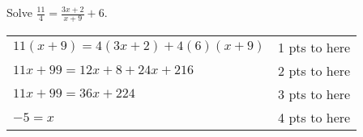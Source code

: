 
{
	Solve $\displaystyle \frac{11}{4}=\frac{3x+2}{x+9}+6$.
}
{
	\begin{tabular}{l r}
	$11(x+9)=4(3x+2)+4(6)(x+9)$ & 1 pts to here \\
	$11x+99=12x+8+24x+216$ & 2 pts to here \\
	$11x+99=36x+224$ & 3 pts to here\\
	$-5=x$ & 4 pts to here
	\end{tabular}
}
